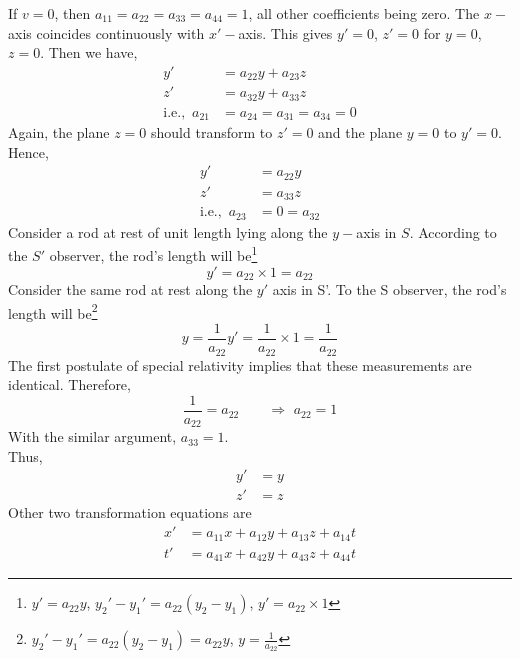 \documentclass[../main-sheet.tex]{subfiles}
\begin{document}
If \(v=0\), then \(a_{11}=a_{22}=a_{33}=a_{44}=1\), all other coefficients being zero. The \(x-\) axis coincides continuously with \(x'-\)axis. This gives \(y'=0\), \(z'=0\) for \(y=0\), \(z=0\). Then we have,
\begin{align*}
    y'&=a_{22 }y+a_{23 }z\\
    z '&=a_{32 }y+a_{33 }z\\
    \text{i.e., }\, a_{21}&=a_{24}=a_{31}=a_{34}=0
\end{align*}
Again, the plane \(z=0\) should transform to \(z'=0\) and the plane \(y=0\) to \(y'=0\). Hence,
\begin{align*}
    y'&=a_{22 }y\\
    z '&=a_{33 }z\\
    \text{i.e., }\, a_{23}&=0=a_{32}
\end{align*}
Consider a rod at rest of unit length lying along the \(y-\)axis in \(S \). According to the \(S'\) observer, the rod's length will be\footnote{\(y'=a_{22}y \), \(y_2'-y_1'=a_{22}(y_2-y_1)\), \(y'=a_{22} \times 1\)}
\[y'=a_{22}\times 1=a_{22}\]
Consider the same rod at rest along the \(y'\) axis in S'. To the S observer, the rod's length will be\footnote{\(y_2'-y_1'=a_{22}(y_2-y_1)=a_{22} y\), \(y=\frac{1}{a_{22}}\)}
\[y=\frac{1}{a_{22}}y'=\frac{1}{a_{22}}\times 1=\frac{1}{a_{22}}\]
The first postulate of special relativity implies that these measurements are identical. Therefore,
\[\frac{1}{a_{22}}=a_{22}\qquad \Rightarrow\,\,a_{22}=1\]
With the similar argument, \(a_{33}=1\).\\
Thus,
\begin{align*}
    y'&=y\\
    z'&=z
\end{align*}
Other two transformation equations are
\begin{align*}
    x'&=a_{11 } x+a_{12 }y+a_{13 }z+a_{14 }t\\
    t '&=a_{41 } x+a_{42 }y+a_{43 }z+a_{44 }t
\end{align*}
\end{document}
